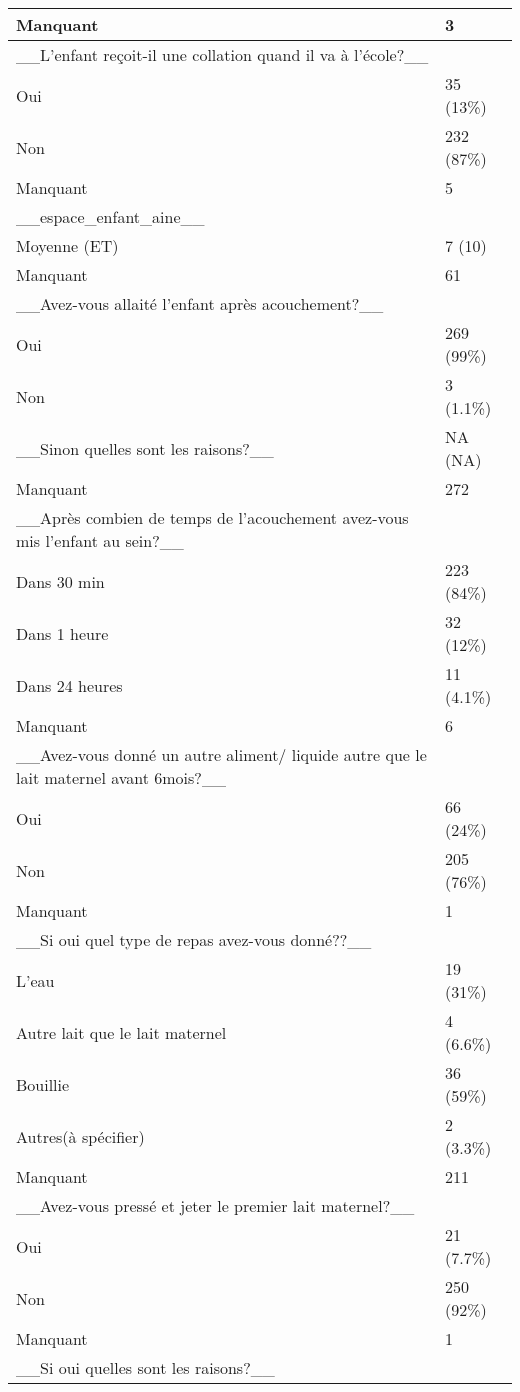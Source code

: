 \documentclass[
]{book}
\begin{document}
\begin{tabular}{l|l}
\hline
Manquant & 3\\
\hline
\_\_L'enfant reçoit-il une collation quand il va à l'école?\_\_ & \\
\hline
Oui & 35 (13\%)\\
\hline
Non & 232 (87\%)\\
\hline
Manquant & 5\\
\hline
\_\_espace\_enfant\_aine\_\_ & \\
\hline
Moyenne  (ET) & 7  (10)\\
\hline
Manquant & 61\\
\hline
\_\_Avez-vous allaité l'enfant après acouchement?\_\_ & \\
\hline
Oui & 269 (99\%)\\
\hline
Non & 3 (1.1\%)\\
\hline
\_\_Sinon quelles sont les raisons?\_\_ & NA  (NA)\\
\hline
Manquant & 272\\
\hline
\_\_Après combien de temps de l'acouchement avez-vous mis l'enfant au sein?\_\_ & \\
\hline
Dans 30 min & 223 (84\%)\\
\hline
Dans 1 heure & 32 (12\%)\\
\hline
Dans 24 heures & 11 (4.1\%)\\
\hline
Manquant & 6\\
\hline
\_\_Avez-vous donné un autre aliment/ liquide autre que le lait maternel avant 6mois?\_\_ & \\
\hline
Oui & 66 (24\%)\\
\hline
Non & 205 (76\%)\\
\hline
Manquant & 1\\
\hline
\_\_Si oui quel type de repas avez-vous donné??\_\_ & \\
\hline
L'eau & 19 (31\%)\\
\hline
Autre lait que le lait maternel & 4 (6.6\%)\\
\hline
Bouillie & 36 (59\%)\\
\hline
Autres(à spécifier) & 2 (3.3\%)\\
\hline
Manquant & 211\\
\hline
\_\_Avez-vous pressé et jeter le premier lait maternel?\_\_ & \\
\hline
Oui & 21 (7.7\%)\\
\hline
Non & 250 (92\%)\\
\hline
Manquant & 1\\
\hline
\_\_Si oui quelles sont les raisons?\_\_ & \\

\end{tabular}
\end{document}
